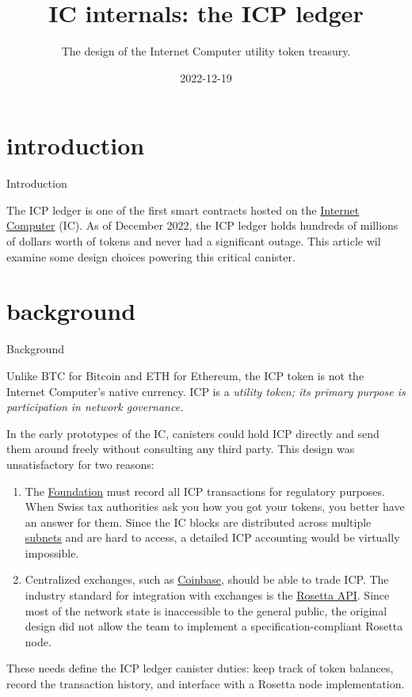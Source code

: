 \documentclass{article}
\title{IC internals: the ICP ledger}
\subtitle{The design of the Internet Computer utility token treasury.}
\date{2022-12-19}
\begin{document}
\section{introduction}{Introduction}

The ICP ledger is one of the first smart contracts hosted on the \href{https://internetcomputer.org}{Internet Computer} (IC).
As of December 2022, the ICP ledger holds hundreds of millions of dollars worth of tokens and never had a significant outage.
This article wil examine some design choices powering this critical canister.

\section{background}{Background}

Unlike BTC for Bitcoin and ETH for Ethereum, the ICP token is not the Internet Computer's native currency.
ICP is a \em{utility token}; its primary purpose is participation in network governance.

In the early prototypes of the IC, canisters could hold ICP directly and send them around freely without consulting any third party.
This design was unsatisfactory for two reasons:
\begin{enumerate}
  \item
    The \href{https://dfinity.org/}{Foundation} must record all ICP transactions for regulatory purposes.
    When Swiss tax authorities ask you how you got your tokens, you better have an answer for them.
    Since the IC blocks are distributed across multiple \href{/posts/08-ic-xnet.html#subnets}{subnets} and are hard to access, a detailed ICP accounting would be virtually impossible.
  \item
    Centralized exchanges, such as \href{https://www.coinbase.com/}{Coinbase}, should be able to trade ICP.
    The industry standard for integration with exchanges is the \href{https://rosetta-api.org/}{Rosetta API}.
    Since most of the network state is inaccessible to the general public, the original design did not allow the team to implement a specification-compliant Rosetta node.
\end{enumerate}

These needs define the ICP ledger canister duties: keep track of token balances, record the transaction history, and interface with a Rosetta node implementation.
\end{document}
